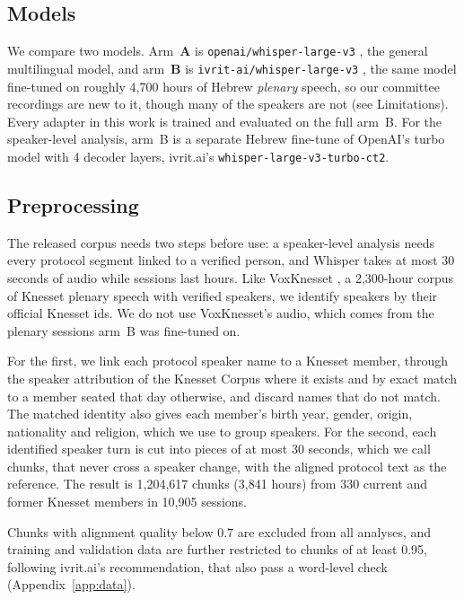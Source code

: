 \documentclass[11pt]{article}
\begin{document}
\subsection{Models}
\label{sec:models}

We compare two models. Arm~\textbf{A} is
\texttt{openai/whisper-large-v3} \citep{radford2023whisper}, the general
multilingual model, and arm~\textbf{B} is \texttt{ivrit-ai/whisper-large-v3}
\citep{ivritai2025whisperv3}, the same model fine-tuned on roughly 4{,}700 hours
of Hebrew \emph{plenary} speech, so our committee recordings are new to it,
though many of the speakers are not (see Limitations). Every adapter in this
work is trained and evaluated on the full arm~B. For the speaker-level analysis, arm~B is a separate Hebrew fine-tune of OpenAI's turbo model with 4 decoder layers, ivrit.ai's \texttt{whisper-large-v3-turbo-ct2}.

\subsection{Preprocessing}
\label{sec:preprocessing}

The released corpus needs two steps before use: a speaker-level analysis needs every
protocol segment linked to a verified person, and Whisper takes at most 30 seconds of audio
while sessions last hours. Like VoxKnesset
\citep{marmor2026voxknesset}, a 2{,}300-hour corpus of Knesset plenary speech
with verified speakers, we identify speakers by their official Knesset ids. We do not
use VoxKnesset's audio, which comes from the plenary sessions
arm~B was fine-tuned on.


For the first, we link each protocol speaker name to a Knesset member, through the speaker attribution of the Knesset Corpus \citep{goldin2025knesset} where it exists and by exact match to a member seated that day otherwise, and
discard names that do not match. The matched identity also gives each member's birth year, gender,
origin, nationality and religion, which we use to group speakers. For the second,
each identified speaker turn is cut into pieces of at most 30 seconds, which we
call chunks, that never cross a speaker change, with the aligned protocol text
as the reference. The result is 1{,}204{,}617 chunks (3{,}841 hours) from 330
current and former Knesset members in 10{,}905 sessions.

Chunks with alignment quality below 0.7 are excluded from all analyses,
and training and validation data are further restricted to chunks of at least 0.95,
following ivrit.ai's recommendation, that also pass a word-level check
(Appendix~\ref{app:data}).
\end{document}
